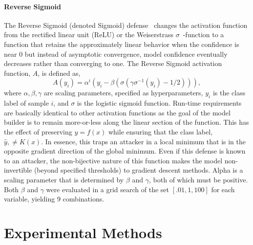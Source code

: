 \documentclass[lettersize,journal]{IEEEtran}
\newcommand{\erik}[1]{\textit{[{\color{brown}Erik: #1}]}}
\begin{document}
\paragraph{Reverse Sigmoid}
The Reverse Sigmoid (denoted Sigmoid) defense~\cite{reverse_sigmoid} changes the activation function from the rectified linear unit (ReLU) or the Weiserstrass $\sigma \!\!$~-function to a function that retains the approximately linear behavior when the confidence is near 0 but instead of asymptotic convergence, model confidence eventually decreases rather than converging to one. The Reverse Sigmoid activation function, $A$, is defined as,
$$
    A(y_i) = \alpha ^i (y_i - \beta(\sigma(\gamma \sigma^{-1}(y_i) - 1/2))),
$$
where $\alpha, \beta, \gamma$ are scaling parameters, specified as hyperparameters, $y_i$ is the class label of sample $i$, and $\sigma$ is the logistic sigmoid function. Run-time requirements are basically identical to other activation functions as the goal of the model builder is to remain more-or-less along the linear section of the function. This has the effect of preserving $y = f(x)$ while ensuring that the class label, $\hat{y},  \neq K(x)$. In essence, this traps an attacker in a local minimum that is in the opposite gradient direction of the global minimum. Even if this defense is known to an attacker, the non-bijective nature of this function makes the model non-invertible (beyond specified thresholds) to gradient descent methods. Alpha is a scaling parameter that is determined by $\beta$ and $\gamma$, both of which must be positive. 
Both $\beta$ and $\gamma$ were evaluated in a grid search of the set $[.01, 1, 100]$ for each variable, yielding 9 combinations.


\section{Experimental Methods}
\label{methods}
\end{document}
